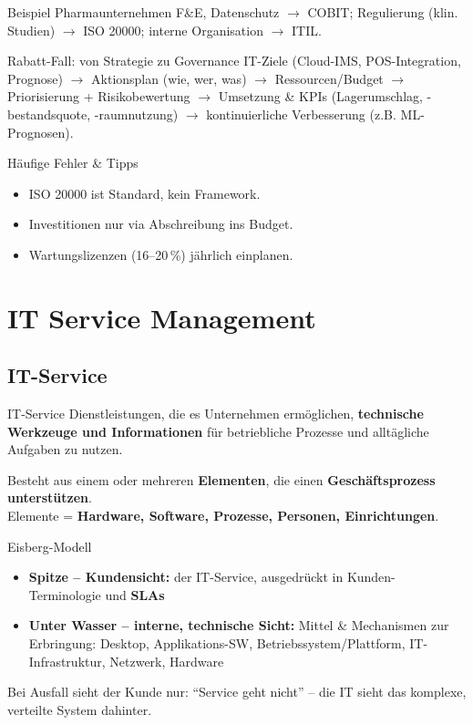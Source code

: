 \documentclass[a4paper, fontsize=7pt]{scrartcl}
\begin{document}
\begin{subbox}{Beispiel Pharmaunternehmen}
F\&E, Datenschutz $\to$ COBIT; Regulierung (klin. Studien) $\to$ ISO 20000;
interne Organisation $\to$ ITIL.
\end{subbox}

\begin{subbox}{Rabatt-Fall: von Strategie zu Governance}
IT-Ziele (Cloud-IMS, POS-Integration, Prognose) $\to$ Aktionsplan (wie, wer,
was) $\to$ Ressourcen/Budget $\to$ Priorisierung + Risikobewertung $\to$
Umsetzung \& KPIs (Lagerumschlag, -bestandsquote, -raumnutzung) $\to$
kontinuierliche Verbesserung (z.B. ML-Prognosen).
\end{subbox}

\begin{subbox}{Häufige Fehler \& Tipps}
\begin{itemize}
    \item ISO 20000 ist Standard, kein Framework.
    \item Investitionen nur via Abschreibung ins Budget.
    \item Wartungslizenzen (16--20\,\%) jährlich einplanen.
\end{itemize}
\end{subbox}

\section{IT Service Management}

\subsection{IT-Service}

\begin{mainbox}{IT-Service}
Dienstleistungen, die es Unternehmen ermöglichen, \textbf{technische Werkzeuge
und Informationen} für betriebliche Prozesse und alltägliche Aufgaben zu nutzen.

Besteht aus einem oder mehreren \textbf{Elementen}, die einen
\textbf{Geschäftsprozess unterstützen}.\\
Elemente = \textbf{Hardware, Software, Prozesse, Personen, Einrichtungen}.
\end{mainbox}

\begin{mainbox}{Eisberg-Modell}
\begin{itemize}
    \item \textbf{Spitze -- Kundensicht:} der IT-Service, ausgedrückt in
          Kunden-Terminologie und \textbf{SLAs}
    \item \textbf{Unter Wasser -- interne, technische Sicht:} Mittel \&
          Mechanismen zur Erbringung: Desktop, Applikations-SW,
          Betriebssystem/Plattform, IT-Infrastruktur, Netzwerk, Hardware
\end{itemize}
Bei Ausfall sieht der Kunde nur: ``Service geht nicht'' -- die IT sieht das
komplexe, verteilte System dahinter.
\end{mainbox}
\end{document}
